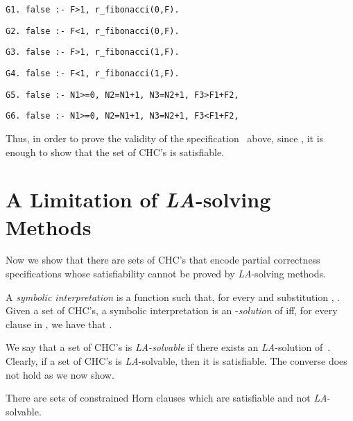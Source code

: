 \documentclass[english]{tlp}
\begin{document}
{\small
\smallskip
\noindent
{\tt{G1. false :- F>1, r\_fibonacci(0,F).}}\nopagebreak
\hspace{10mm}

\noindent
{\tt{G2. false :- F<1, r\_fibonacci(0,F).}}\nopagebreak

\noindent
{\tt{G3. false :- F>1, r\_fibonacci(1,F).}}\nopagebreak
\hspace{10mm}

\noindent
{\tt{G4. false :- F<1, r\_fibonacci(1,F).}}

\noindent
{\tt{G5. false :- N1>=0, N2=N1+1, N3=N2+1, F3>F1+F2,}}\nopagebreak 

         
\noindent  
{\tt{G6. false :- N1>=0, N2=N1+1, N3=N2+1, F3<F1+F2,}}\nopagebreak


} 

\noindent
Thus, in order to prove 
the validity of the specification~ above, 
since ,
it is enough to show that the set
 of CHC's  
is satisfiable.

\section{A Limitation of {\textit{LA}}-solving Methods}
\label{sec:Limitations}

Now we show that there are sets of CHC's that encode
partial correctness specifications whose 
satisfiability cannot be proved by {\textit {LA}}-solving methods.

A {\it symbolic interpretation} is a function  such that, for every  and substitution , 
.
Given a set  of CHC's, a symbolic interpretation  is an 
-{\it solution}
of  iff, for every clause  in , 
we have that
.

We say that a set  of CHC's is {\textit {LA-solvable}} 
if there exists an {\textit {LA}}-solution of~.
Clearly, if a  set of CHC's is {\textit {LA}}-solvable, then it is satisfiable.
The converse does not hold as we now show.

\vspace{-1mm}
\begin{theorem}\label{thm:limitation}
	There are sets of 
	constrained Horn clauses which are satisfiable and not \mbox{{\textit {LA}}-solvable}.\end{theorem}
\end{document}
